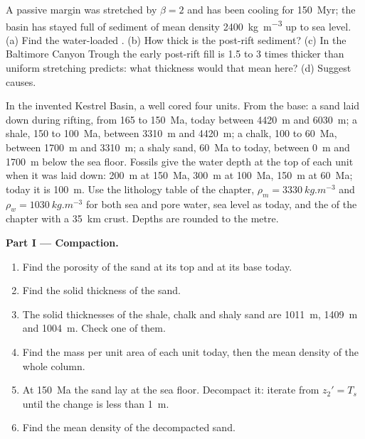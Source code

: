 \begin{exercise}[$\star\star\star$]\label{exo:b2:basins-compared:12}
A passive margin was stretched by $\beta = 2$ and has been cooling for \qty{150}{Myr}; the
basin has stayed full of sediment of mean density \qty{2400}{kg.m^{-3}} up to sea level.
(a) Find the water-loaded . (b) How thick is the post-rift sediment?
(c) In the Baltimore Canyon Trough the early post-rift fill is 1.5 to 3 times thicker than
uniform stretching predicts: what thickness would that mean here? (d) Suggest causes.
\end{exercise}

\begin{problem}\label{pb:b2:basins-compared:1}
In the invented Kestrel Basin, a well cored four units. From the base: a sand laid down during
rifting, from 165 to \qty{150}{Ma}, today between \qty{4420}{m} and \qty{6030}{m}; a shale, 150
to \qty{100}{Ma}, between \qty{3310}{m} and \qty{4420}{m}; a chalk, 100 to \qty{60}{Ma}, between
\qty{1700}{m} and \qty{3310}{m}; a shaly sand, \qty{60}{Ma} to today, between \qty{0}{m} and
\qty{1700}{m} below the sea floor. Fossils give the water depth at the top of each unit when it
was laid down: \qty{200}{m} at \qty{150}{Ma}, \qty{300}{m} at \qty{100}{Ma}, \qty{150}{m} at
\qty{60}{Ma}; today it is \qty{100}{m}. Use the lithology table of the chapter, $\rho_m =
\qty{3330}{kg.m^{-3}}$ and $\rho_w = \qty{1030}{kg.m^{-3}}$ for both sea and pore water, sea level
as today, and the  of the chapter with a \qty{35}{km} crust. Depths are rounded to
the metre.

\noindent\textbf{Part I --- Compaction.}
\begin{enumerate}
  \item Find the porosity of the sand at its top and at its base today.
  \item Find the solid thickness of the sand.
  \item The solid thicknesses of the shale, chalk and shaly sand are \qty{1011}{m},
        \qty{1409}{m} and \qty{1004}{m}. Check one of them.
  \item Find the mass per unit area of each unit today, then the mean density of the whole
        column.
  \item At \qty{150}{Ma} the sand lay at the sea floor. Decompact it: iterate from $z_2' =
        T_s$ until the change is less than \qty{1}{m}.
  \item Find the mean density of the decompacted sand.
\end{enumerate}


\end{problem}
